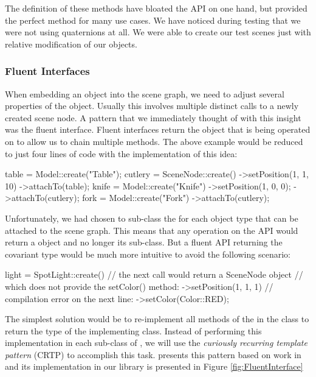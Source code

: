 			The definition of these methods have bloated the API on one hand, but provided the perfect method for many use cases. We have noticed during testing that we were not using quaternions at all. We were able to create our test scenes just with relative modification of our objects.

		\subsubsection{Fluent Interfaces}

			When embedding an object into the scene graph, we need to adjust several properties of the object. Usually this involves multiple distinct calls to a newly created scene node. A pattern that we immediately thought of with this insight was the fluent interface\cite{Fowler2010}. Fluent interfaces return the object that is being operated on to allow us to chain multiple methods. The above example would be reduced to just four lines of code with the implementation of this idea:

			\begin{code}[4]
				table = Model::create("Table");
				cutlery = SceneNode::create()
				    ->setPosition(1, 1, 10)
				    ->attachTo(table);
				knife = Model::create("Knife")
				    ->setPosition(1, 0, 0);
				    ->attachTo(cutlery);
				fork = Model::create("Fork")
				    ->attachTo(cutlery);
			\end{code}

			Unfortunately, we had chosen to sub-class the  for each object type that can be attached to the scene graph. This means that any operation on the  API would return a  object and no longer its sub-class. But a fluent API returning the covariant type would be much more intuitive to avoid the following scenario:
			
			\begin{code}[4]
				light = SpotLight::create()
				    // the next call would return a SceneNode object
				    // which does not provide the setColor() method:
				    ->setPosition(1, 1, 1)
				    // compilation error on the next line:
				    ->setColor(Color::RED);
			\end{code}

			The simplest solution would be to re-implement all methods of the  in the  class to return the type of the implementing class. Instead of performing this implementation in each sub-class of , we will use the \emph{curiously recurring template pattern} (CRTP) to accomplish this task. \cite{Lippman:1996:CG:260627} presents this pattern based on work in \cite{Barton:1994:SEC:561392} and its implementation in our library is presented in Figure \ref{fig:FluentInterface}

